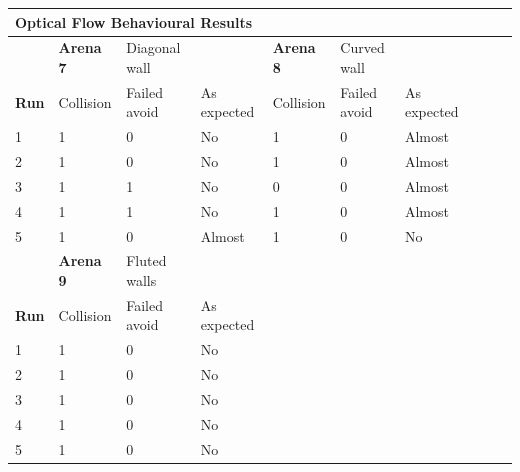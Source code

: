 \documentclass[a4paper,12pt]{article}
\begin{document}
\begin{center}
  \begin{table}
    \begin{tabular}{|l|l|l|l|l|l|l|l|l|l|}
      \hline
      \multicolumn{4}{|l|}{\textbf{Optical Flow Behavioural Results} }   &                  &              &               \\ \hline
                   & \textbf{Arena 7} & Diagonal wall      &             & \textbf{Arena 8} & Curved wall  &               \\ \hline
      \textbf{Run} & Collision        & Failed avoid       & As expected & Collision        & Failed avoid & As expected   \\ \hline
      1            &  1               & 0                  & No          & 1                & 0            & Almost        \\ \hline
      2            &  1               & 0                  & No          & 1                & 0            & Almost        \\ \hline
      3            &  1               & 1                  & No          & 0                & 0            & Almost        \\ \hline
      4            &  1               & 1                  & No          & 1                & 0            & Almost        \\ \hline
      5            &  1               & 0                  & Almost      & 1                & 0            & No            \\ \hline
                   & \textbf{Arena 9} & Fluted walls       &             & \multicolumn{3}{l|}{\multirow{5}{*}{}}          \\ \cline{1-4}
      \textbf{Run} & Collision        & Failed avoid       & As expected & \multicolumn{3}{l|}{}                           \\ \cline{1-4}
      1            & 1                & 0                  & No          & \multicolumn{3}{l|}{}                           \\ \cline{1-4}
      2            & 1                & 0                  & No          & \multicolumn{3}{l|}{}                           \\ \cline{1-4}
      3            & 1                & 0                  & No          & \multicolumn{3}{l|}{}                           \\ \cline{1-4}
      4            & 1                & 0                  & No          & \multicolumn{3}{l|}{}                           \\ \cline{1-4}
      5            & 1                & 0                  & No          & \multicolumn{3}{l|}{}                           \\ \hline


\end{tabular}
\end{table}
\end{center}
\end{document}
